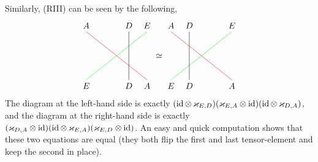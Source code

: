 Similarly, (RIII) can be seen by the following,
\[\begin{tikzpicture}[rotate=90,
      xshift=-1cm,
      baseline=-\dimexpr\fontdimen22\textfont2\relax]
      \draw[red] (0,0)--(2,2.5);
      \draw[green] (0,2.5)--(2,0);
      \draw (0,0.75)--(2,0.75);
      \path (-0.25,0) node[font=\normalsize] {$A$};
      \path (-0.25,0.75) node[font=\normalsize] {$D$};
      \path (-0.25,2.5) node[font=\normalsize] {$E$};
      \path (2.25,0) node[font=\normalsize] {$E$};
      \path (2.25,0.75) node[font=\normalsize] {$D$};
      \path (2.25,2.5) node[font=\normalsize] {$A$};
     \end{tikzpicture}\simeq\begin{tikzpicture}[rotate=90,
      xshift=-1cm,
      baseline=-\dimexpr\fontdimen22\textfont2\relax]
      \draw[red] (0,0)--(2,2.5);
      \draw[green] (0,2.5)--(2,0);
      \draw (0,1.75)--(2,1.75);
      \path (-0.25,0) node[font=\normalsize] {$A$};
      \path (-0.25,1.75) node[font=\normalsize] {$D$};
      \path (-0.25,2.5) node[font=\normalsize] {$E$};
      \path (2.25,0) node[font=\normalsize] {$E$};
      \path (2.25,1.75) node[font=\normalsize] {$D$};
      \path (2.25,2.5) node[font=\normalsize] {$A$};
     \end{tikzpicture}\]
The diagram at the left-hand side is exactly $(\operatorname{id}\otimes\,\varkappa_{E,D})(\varkappa_{E,A}\otimes\operatorname{id})(\operatorname{id}\otimes\,\varkappa_{D,A})$, and the diagram at the right-hand side is exactly $(\varkappa_{D,A}\otimes\operatorname{id})(\operatorname{id}\otimes\,\varkappa_{E,A})(\varkappa_{E,D}\otimes\operatorname{id})$. An easy and quick computation shows that these two equations are equal (they both flip the first and last tensor-element and keep the second in place).

